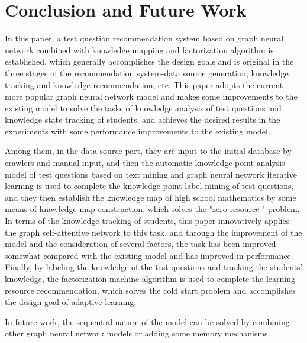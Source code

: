 \chapter{Conclusion and Future Work}




In this paper, a test question recommendation system based on graph neural network combined with knowledge mapping and factorization algorithm is established, which generally accomplishes the design goals and is original in the three stages of the recommendation system-data source generation, knowledge tracking and knowledge recommendation, etc. This paper adopts the current more popular graph neural network model and makes some improvements to the existing model to solve the tasks of knowledge analysis of test questions and knowledge state tracking of students, and achieves the desired results in the experiments with some performance improvements to the existing model.

Among them, in the data source part, they are input to the initial database by crawlers and manual input, and then the automatic knowledge point analysis model of test questions based on text mining and graph neural network iterative learning is used to complete the knowledge point label mining of test questions, and they then establish the knowledge map of high school mathematics by some means of knowledge map construction, which solves the "zero resource " problem. In terms of the knowledge tracking of students, this paper innovatively applies the graph self-attentive network to this task, and through the improvement of the model and the consideration of several factors, the task has been improved somewhat compared with the existing model and has improved in performance. Finally, by labeling the knowledge of the test questions and tracking the students' knowledge, the factorization machine algorithm is used to complete the learning resource recommendation, which solves the cold start problem and accomplishes the design goal of adaptive learning.

In future work, the sequential nature of the model can be solved by combining other graph neural network models or adding some memory mechanisms.